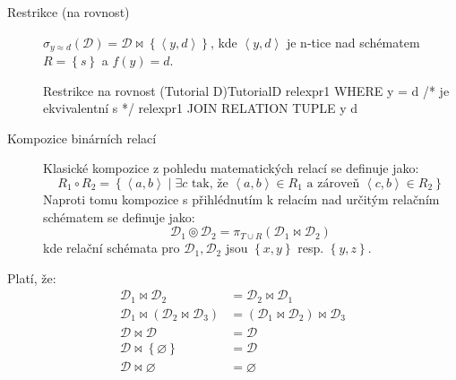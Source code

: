 \begin{description}
\item[Restrikce (na rovnost)] $\sigma_{y \approx d} (\mathcal{D}) = \mathcal{D} \Join \left\{ \left\langle y, d \right\rangle \right\} $, kde $\left\langle y, d \right\rangle$ je n-tice nad schématem $R = \left\{ s \right\}$ a $f(y) = d$.
\begin{upcode}{Restrikce na rovnost (Tutorial D)}{}{TutorialD}
relexpr1 WHERE y = d
/* je ekvivalentní s */
relexpr1 JOIN RELATION {TUPLE {y d}}
\end{upcode}

\item[Kompozice binárních relací] Klasické kompozice z pohledu matematických relací se definuje jako:
$$
R_{1} \circ R_{2} = \left\{ \left\langle a, b \right\rangle \; | \; \exists c \text{ tak, že } \left\langle a, b \right\rangle \in R_{1} \text{ a zároveň } \left\langle c, b \right\rangle \in R_{2} \right\}
$$
Naproti tomu kompozice s přihlédnutím k relacím nad určitým relačním schématem se definuje jako:
$$
\mathcal{D}_{1} \circledcirc \mathcal{D}_{2} = \pi_{T \cup R} (\mathcal{D}_{1} \Join \mathcal{D}_{2})
$$
kde relační schémata pro $\mathcal{D}_{1}, \mathcal{D}_{2}$ jsou $\left\{ x, y \right\}$ resp. $\left\{ y, z \right\}$.

\end{description}
\begin{upquote}
Platí, že:
\begin{align}
\tag{Komutativita}\mathcal{D}_{1} \Join \mathcal{D}_{2} &= \mathcal{D}_{2} \Join \mathcal{D}_{1} \\
\tag{Asociativita}\mathcal{D}_{1} \Join (\mathcal{D}_{2} \Join \mathcal{D}_{3}) &= (\mathcal{D}_{1} \Join \mathcal{D}_{2}) \Join \mathcal{D}_{3} \\
\tag{Idempotence}\mathcal{D} \Join \mathcal{D} &= \mathcal{D} \\
\tag{Neutralita vůči množině obs. $\varnothing$}\mathcal{D} \Join \left\{ \varnothing \right\} &= \mathcal{D} \\
\tag{Neutralita vůči prázdné množině}\mathcal{D} \Join \varnothing &= \varnothing
\end{align}
\end{upquote}
